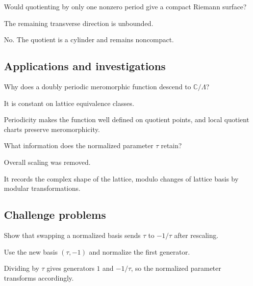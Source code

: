\begin{exercise}\label{exr:iv27-expand-12}
Would quotienting by only one nonzero period give a compact Riemann surface?
\end{exercise}
\begin{hint}
The remaining transverse direction is unbounded.
\end{hint}
\begin{solution}
No. The quotient is a cylinder and remains noncompact.
\end{solution}

\subsection*{Applications and investigations}

\begin{exercise}\label{exr:iv27-expand-13}
Why does a doubly periodic meromorphic function descend to \(\mathbb C/\Lambda\)?
\end{exercise}
\begin{hint}
It is constant on lattice equivalence classes.
\end{hint}
\begin{solution}
Periodicity makes the function well defined on quotient points, and local quotient charts preserve meromorphicity.
\end{solution}

\begin{exercise}\label{exr:iv27-expand-14}
What information does the normalized parameter \(\tau\) retain?
\end{exercise}
\begin{hint}
Overall scaling was removed.
\end{hint}
\begin{solution}
It records the complex shape of the lattice, modulo changes of lattice basis by modular transformations.
\end{solution}

\subsection*{Challenge problems}

\begin{exercise}\label{exr:iv27-expand-15}
Show that swapping a normalized basis sends \(\tau\) to \(-1/\tau\) after rescaling.
\end{exercise}
\begin{hint}
Use the new basis \((\tau,-1)\) and normalize the first generator.
\end{hint}
\begin{solution}
Dividing by \(\tau\) gives generators \(1\) and \(-1/\tau\), so the normalized parameter transforms accordingly.
\end{solution}

